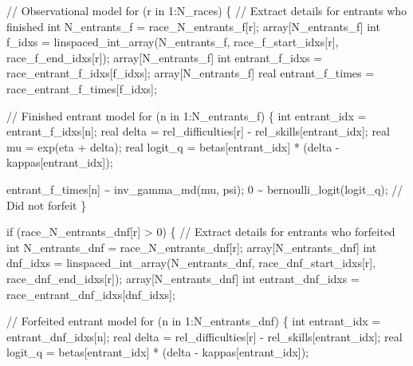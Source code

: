 \documentclass[
  letterpaper,
  DIV=11,
  numbers=noendperiod]{scrartcl}
\newenvironment{Shaded}{\begin{snugshade}}{\end{snugshade}}
\newcommand{\CommentTok}[1]{\textcolor[rgb]{0.37,0.37,0.37}{#1}}
\newcommand{\ControlFlowTok}[1]{\textcolor[rgb]{0.00,0.23,0.31}{#1}}
\newcommand{\DataTypeTok}[1]{\textcolor[rgb]{0.68,0.00,0.00}{#1}}
\newcommand{\DecValTok}[1]{\textcolor[rgb]{0.68,0.00,0.00}{#1}}
\newcommand{\NormalTok}[1]{\textcolor[rgb]{0.00,0.23,0.31}{#1}}
\begin{document}
\begin{codelisting}
\begin{Shaded}
\begin{Highlighting}[]
  \CommentTok{// Observational model}
  \ControlFlowTok{for}\NormalTok{ (r }\ControlFlowTok{in} \DecValTok{1}\NormalTok{:N\_races) \{}
    \CommentTok{// Extract details for entrants who finished}
    \DataTypeTok{int}\NormalTok{ N\_entrants\_f = race\_N\_entrants\_f[r];}
    \DataTypeTok{array}\NormalTok{[N\_entrants\_f] }\DataTypeTok{int}\NormalTok{ f\_idxs}
\NormalTok{      = linspaced\_int\_array(N\_entrants\_f,}
\NormalTok{                            race\_f\_start\_idxs[r],}
\NormalTok{                            race\_f\_end\_idxs[r]);}
    \DataTypeTok{array}\NormalTok{[N\_entrants\_f] }\DataTypeTok{int}\NormalTok{ entrant\_f\_idxs}
\NormalTok{      = race\_entrant\_f\_idxs[f\_idxs];}
    \DataTypeTok{array}\NormalTok{[N\_entrants\_f] }\DataTypeTok{real}\NormalTok{ entrant\_f\_times}
\NormalTok{      = race\_entrant\_f\_times[f\_idxs];}

    \CommentTok{// Finished entrant model}
    \ControlFlowTok{for}\NormalTok{ (n }\ControlFlowTok{in} \DecValTok{1}\NormalTok{:N\_entrants\_f) \{}
      \DataTypeTok{int}\NormalTok{ entrant\_idx = entrant\_f\_idxs[n];}
      \DataTypeTok{real}\NormalTok{ delta = rel\_difficulties[r] {-} rel\_skills[entrant\_idx];}
      \DataTypeTok{real}\NormalTok{ mu = exp(eta + delta);}
      \DataTypeTok{real}\NormalTok{ logit\_q = betas[entrant\_idx] * (delta {-} kappas[entrant\_idx]);}

\NormalTok{      entrant\_f\_times[n] \textasciitilde{} inv\_gamma\_md(mu, psi);}
      \DecValTok{0}\NormalTok{ \textasciitilde{} bernoulli\_logit(logit\_q); }\CommentTok{// Did not forfeit}
\NormalTok{    \}}

    \ControlFlowTok{if}\NormalTok{ (race\_N\_entrants\_dnf[r] \textgreater{} }\DecValTok{0}\NormalTok{) \{}
      \CommentTok{// Extract details for entrants who forfeited}
      \DataTypeTok{int}\NormalTok{ N\_entrants\_dnf = race\_N\_entrants\_dnf[r];}
      \DataTypeTok{array}\NormalTok{[N\_entrants\_dnf]}
        \DataTypeTok{int}\NormalTok{ dnf\_idxs = linspaced\_int\_array(N\_entrants\_dnf,}
\NormalTok{                                           race\_dnf\_start\_idxs[r],}
\NormalTok{                                           race\_dnf\_end\_idxs[r]);}
      \DataTypeTok{array}\NormalTok{[N\_entrants\_dnf]}
        \DataTypeTok{int}\NormalTok{ entrant\_dnf\_idxs = race\_entrant\_dnf\_idxs[dnf\_idxs];}

      \CommentTok{// Forfeited entrant model}
      \ControlFlowTok{for}\NormalTok{ (n }\ControlFlowTok{in} \DecValTok{1}\NormalTok{:N\_entrants\_dnf) \{}
        \DataTypeTok{int}\NormalTok{ entrant\_idx = entrant\_dnf\_idxs[n];}
        \DataTypeTok{real}\NormalTok{ delta = rel\_difficulties[r] {-} rel\_skills[entrant\_idx];}
        \DataTypeTok{real}\NormalTok{ logit\_q = betas[entrant\_idx] * (delta {-} kappas[entrant\_idx]);}


\end{Highlighting}
\end{Shaded}
\end{codelisting}
\end{document}
